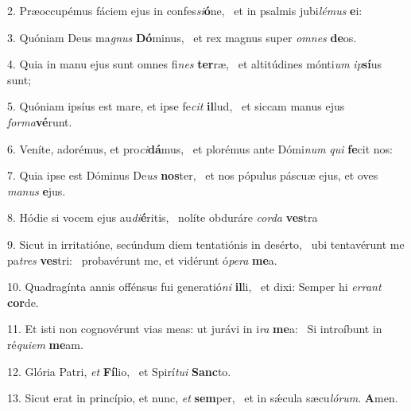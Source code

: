 2. Præoccupémus fáciem ejus in confes\textit{si}\textbf{ó}ne, \ast\  et in psalmis jubi\textit{lé}\textit{mus} \textbf{e}i:\

3. Quóniam Deus ma\textit{gnus} \textbf{Dó}minus, \ast\  et rex magnus super \textit{om}\textit{nes} \textbf{de}os.\

4. Quia in manu ejus sunt omnes fi\textit{nes} \textbf{ter}ræ, \ast\  et altitúdines mónti\textit{um} \textit{ip}\textbf{sí}us sunt;\

5. Quóniam ipsíus est mare, et ipse fe\textit{cit} \textbf{il}lud, \ast\  et siccam manus ejus \textit{for}\textit{ma}\textbf{vé}runt.\

6. Veníte, adorémus, et pro\textit{ci}\textbf{dá}mus, \ast\  et plorémus ante Dómi\textit{num} \textit{qui} \textbf{fe}cit nos:\

7. Quia ipse est Dóminus De\textit{us} \textbf{nos}ter, \ast\  et nos pópulus páscuæ ejus, et oves \textit{ma}\textit{nus} \textbf{e}jus.\

8. Hódie si vocem ejus au\textit{di}\textbf{é}ritis, \ast\  nolíte obduráre \textit{cor}\textit{da} \textbf{ves}tra\

9. Sicut in irritatióne, secúndum diem tentatiónis in desérto, \dag\  ubi tentavérunt me pa\textit{tres} \textbf{ves}tri: \ast\  probavérunt me, et vidérunt ó\textit{pe}\textit{ra} \textbf{me}a.\

10. Quadragínta annis offénsus fui generatió\textit{ni} \textbf{il}li, \ast\  et dixi: Semper hi \textit{er}\textit{rant} \textbf{cor}de.\

11. Et isti non cognovérunt vias meas: ut jurávi in i\textit{ra} \textbf{me}a: \ast\  Si introíbunt in ré\textit{qui}\textit{em} \textbf{me}am.\

12. Glória Patri, \textit{et} \textbf{Fí}lio, \ast\  et Spirí\textit{tu}\textit{i} \textbf{Sanc}to.\

13. Sicut erat in princípio, et nunc, \textit{et} \textbf{sem}per, \ast\  et in sǽcula sæcu\textit{ló}\textit{rum}. \textbf{A}men.\

